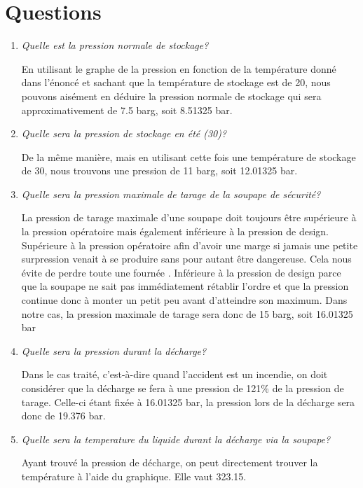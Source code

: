 \documentclass{report}
\begin{document}
\section*{Questions}
\begin{enumerate}
\item\textit{Quelle est la pression normale de stockage?}

En utilisant le graphe de la pression en fonction de la température donné dans l'énoncé et sachant que la température de stockage est de 20\celsius , nous pouvons aisément en déduire la pression normale de stockage qui sera approximativement de 7.5 barg, soit 8.51325 bar.

\item\textit{Quelle sera la pression de stockage en été (30\celsius)?}

De la même manière, mais en utilisant cette fois une température de stockage de 30\celsius , nous trouvons une pression de 11 barg, soit 12.01325 bar.

\item\textit{Quelle sera la pression maximale de tarage de la soupape de sécurité?}

La pression de tarage maximale d'une soupape doit toujours être supérieure à la pression opératoire mais également inférieure à la pression de design. Supérieure à la pression opératoire afin d'avoir une marge si jamais une petite surpression venait à se produire sans pour autant être dangereuse. Cela nous évite de perdre toute une \og fournée \fg. Inférieure à la pression de design parce que la soupape ne sait pas immédiatement rétablir l'ordre et que la pression continue donc à monter un petit peu avant d'atteindre son maximum. 
Dans notre cas, la pression maximale de tarage sera donc de 15 barg, soit 16.01325 bar 

\item\textit{Quelle sera la pression durant la décharge?}

Dans le cas traité, c'est-à-dire quand l'accident est un incendie, on doit considérer que la décharge se fera à une pression de 121\% de la pression de tarage. Celle-ci étant fixée à 16.01325 bar, la pression lors de la décharge sera donc de 19.376 bar.

\item\textit{Quelle sera la temperature du liquide durant la décharge via la soupape?}

Ayant trouvé la pression de décharge, on peut directement trouver la température à l'aide du graphique. Elle vaut 323.15\kelvin.


\end{enumerate}
\end{document}

